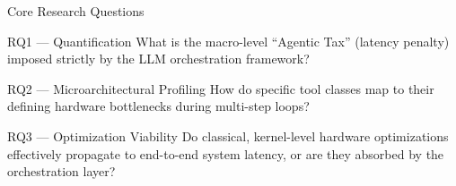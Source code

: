 \documentclass[aspectratio=169, 10pt]{beamer}
\begin{document}
\begin{frame}{Core Research Questions}
  \vspace{0.5em}
  \begin{exampleblock}{RQ1 --- Quantification}
    What is the macro-level ``Agentic Tax'' (latency penalty) imposed strictly by the LLM orchestration framework?
  \end{exampleblock}
  \vspace{0.3em}
  \begin{exampleblock}{RQ2 --- Microarchitectural Profiling}
    How do specific tool classes map to their defining hardware bottlenecks during multi-step loops?
  \end{exampleblock}
  \vspace{0.3em}
  \begin{exampleblock}{RQ3 --- Optimization Viability}
    Do classical, kernel-level hardware optimizations effectively propagate to end-to-end system latency, or are they absorbed by the orchestration layer?
  \end{exampleblock}
\end{frame}
\end{document}
